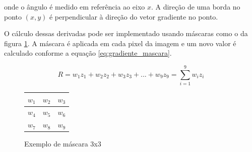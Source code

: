 onde o ângulo é medido em referência ao eixo \(x\). A direção de uma borda no ponto \((x,y)\) é perpendicular à direção do vetor gradiente no ponto.

O cálculo dessas derivadas pode ser implementado usando máscaras como o da figura \ref{fig:gradiente_mascara}. A máscara é aplicada em cada pixel da imagem e um novo valor é calculado conforme a equação \ref{eq:gradiente_mascara}.

\begin{equation}
R = w_1 z_1 + w_2 z_2 + w_3 z_3 + ... +w_9 z_9 = \sum_{i=1}^{9}{w_iz_i}
\label{eq:gradiente_mascara}
\end{equation}

\begin{figure}
\begin{center}
\begin{tabular}{| l |c | r |}
\hline
\(w_1\) & \(w_2\) & \(w_3\) \\ \hline
\(w_4\) & \(w_5\) & \(w_6\) \\ \hline
\(w_7\) & \(w_8\) & \(w_9\) \\ \hline
\end{tabular}
\end{center}
\caption{Exemplo de máscara 3x3}
\label{fig:gradiente_mascara}
\end{figure}

